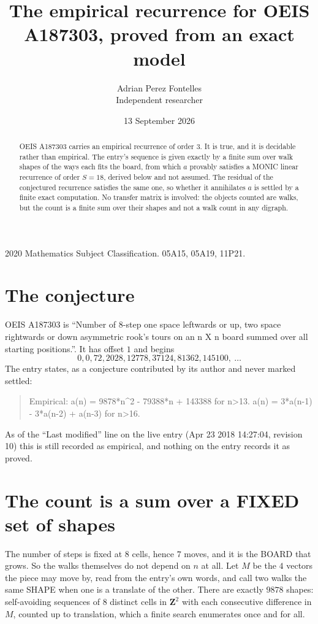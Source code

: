 \documentclass[11pt,a4paper]{article}
\title{The empirical recurrence for OEIS A187303, proved from an exact model}
\author{Adrian Perez Fontelles\\ \small Independent researcher}
\date{13 September 2026}
\theoremstyle{plain}
\theoremstyle{definition}
\begin{document}
\maketitle

\begin{abstract}
OEIS A187303 carries an empirical recurrence of order $3$. It is true, and it is
decidable rather than empirical. The entry's sequence is given exactly by a finite sum over walk shapes of the ways each fits the board, from
which $a$ provably satisfies a MONIC linear recurrence of order $S=18$, derived below and not
assumed. The residual of the conjectured recurrence satisfies the same one, so whether it
annihilates $a$ is settled by a finite exact computation. No transfer matrix is involved: the objects counted are walks, but the count is a finite sum over their shapes and not a walk count in any digraph.
\end{abstract}

\noindent\small 2020 Mathematics Subject Classification. 05A15, 05A19, 11P21.\normalsize

\section{The conjecture}

OEIS A187303 is ``Number of 8-step one space leftwards or up, two space rightwards or down asymmetric rook's tours on an n X n board summed over all starting positions.''. It has offset $1$ and begins
\[
0, 0, 72, 2028, 12778, 37124, 81362, 145100,\ \dots
\]
The entry states, as a conjecture contributed by its author and never marked settled:
\begin{quote}
Empirical: a(n) = 9878*n\^{}2 - 79388*n + 143388 for n>13. a(n) = 3*a(n-1) - 3*a(n-2) + a(n-3) for n>16.
\end{quote}
As of the ``Last modified'' line on the live entry (Apr 23 2018 14:27:04, revision 10)
this is still recorded as empirical, and nothing on the entry records it as proved.

\section{The count is a sum over a FIXED set of shapes}

The number of steps is fixed at $8$ cells, hence $7$ moves, and it is the BOARD
that grows. So the walks themselves do not depend on $n$ at all. Let $M$ be the $4$
vectors the piece may move by, read from the entry's own words, and call two walks the same
SHAPE when one is a translate of the other. There are exactly $9878$ shapes: self-avoiding
sequences of $8$ distinct cells in $\mathbf{Z}^{2}$ with each consecutive difference in
$M$, counted up to translation, which a finite search enumerates once and for all.
\end{document}
